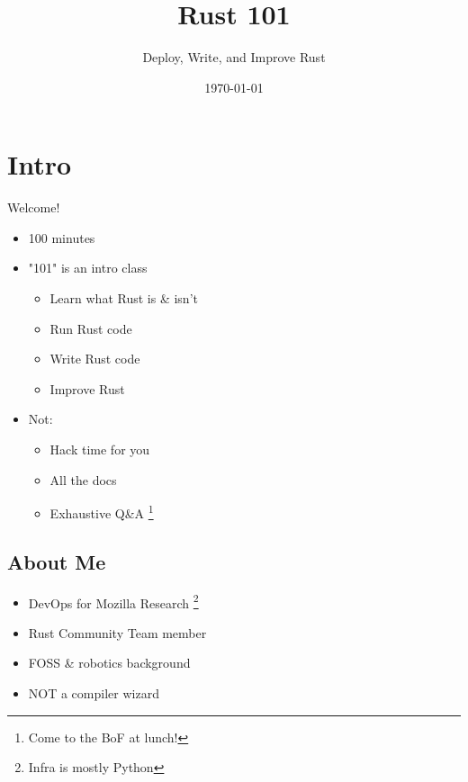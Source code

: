 \documentclass[xcolor={svgnames},hyperref]{beamer}
\title[Rust 101]{Rust 101}
\subtitle{Deploy, Write, and Improve Rust}
\author{\name}
\date{\today}
\begin{document}
\begin{frame}
\titlepage
\end{frame}

\section{Intro}

    \begin{frame}
        Welcome!
         \begin{itemize}
            \item 100 minutes
            \item "101" is an intro class
            \begin{itemize}
                \item Learn what Rust is \& isn't
                \item Run Rust code
                \item Write Rust code
                \item Improve Rust
            \end{itemize}
            \item Not:
            \begin{itemize}
                \item Hack time for you
                \item All the docs
                \item Exhaustive Q\&A \footnote{Come to the BoF at lunch!}
            \end{itemize}
        \end{itemize}
    \end{frame}

    \subsection{About Me}

    \begin{frame}
        \begin{itemize}
            \item DevOps for Mozilla Research \footnote{Infra is mostly Python}
            \item Rust Community Team member
            \item FOSS \& robotics background
            \item NOT a compiler wizard
        \end{itemize}
    \end{frame}
\end{document}
